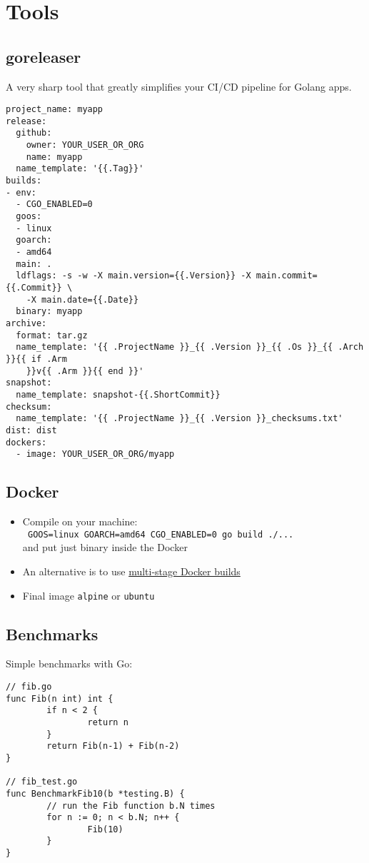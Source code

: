 \documentclass[11pt, letterpaper]{article}
\begin{document}
\pagebreak
\section{Tools}

\subsection{goreleaser}

A very sharp tool that greatly simplifies your CI/CD pipeline for Golang apps.

\begin{verbatim}
project_name: myapp
release:
  github:
    owner: YOUR_USER_OR_ORG
    name: myapp
  name_template: '{{.Tag}}'
builds:
- env:
  - CGO_ENABLED=0
  goos:
  - linux
  goarch:
  - amd64
  main: .
  ldflags: -s -w -X main.version={{.Version}} -X main.commit={{.Commit}} \
    -X main.date={{.Date}}
  binary: myapp
archive:
  format: tar.gz
  name_template: '{{ .ProjectName }}_{{ .Version }}_{{ .Os }}_{{ .Arch }}{{ if .Arm
    }}v{{ .Arm }}{{ end }}'
snapshot:
  name_template: snapshot-{{.ShortCommit}}
checksum:
  name_template: '{{ .ProjectName }}_{{ .Version }}_checksums.txt'
dist: dist
dockers:
  - image: YOUR_USER_OR_ORG/myapp
\end{verbatim}

\subsection{Docker}

\begin{itemize}
\item Compile on your machine:\\ \verb| GOOS=linux GOARCH=amd64 CGO_ENABLED=0 go build ./...| \\ and put just binary inside the Docker
\item An alternative is to use \href{https://docs.docker.com/develop/develop-images/multistage-build/}{multi-stage Docker builds}
\item Final image \verb|alpine| or \verb|ubuntu|
\end{itemize}

\subsection{Benchmarks}

Simple benchmarks with Go:

\begin{verbatim}
// fib.go
func Fib(n int) int {
        if n < 2 {
                return n
        }
        return Fib(n-1) + Fib(n-2)
}

// fib_test.go
func BenchmarkFib10(b *testing.B) {
        // run the Fib function b.N times
        for n := 0; n < b.N; n++ {
                Fib(10)
        }
}
\end{verbatim}
\end{document}
